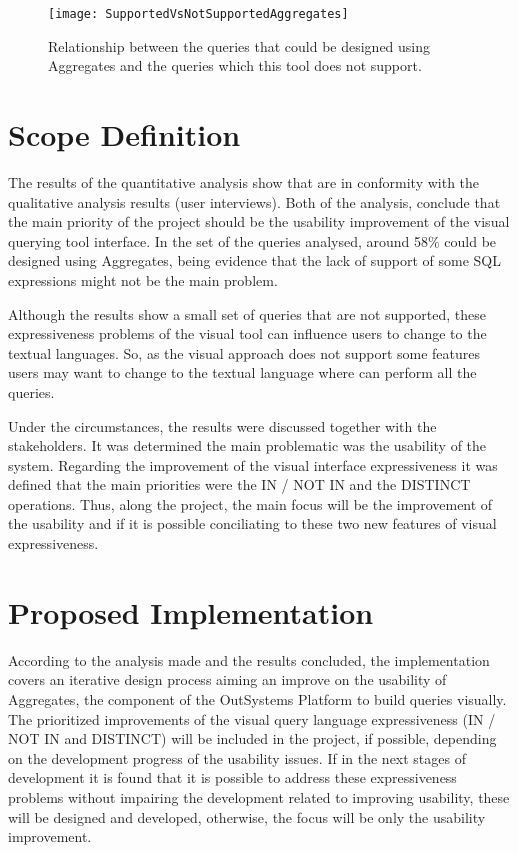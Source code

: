 \begin{figure}[htbp]
	\centering
	\texttt{[image: SupportedVsNotSupportedAggregates]}
	\caption{Relationship between the queries that could be designed using Aggregates and the queries which this tool does not support.}
	\label{fig:aggregates_supported_vs_not_supported_stats}
\end{figure}

\section{Scope Definition}
\label{sec:scope_definition}
The results of the quantitative analysis show that are in conformity with the qualitative analysis results (user interviews). Both of the analysis, conclude that the main priority of the project should be the usability improvement of the visual querying tool interface. 
In the set of the queries analysed, around 58\% could be designed using Aggregates, being evidence that the lack of support of some SQL expressions might not be the main problem.

Although the results show a small set of queries that are not supported, these expressiveness problems of the visual tool can influence users to change to the textual languages. So, as the visual approach does not support some features users may want to change to the textual language where can perform all the queries.

Under the circumstances, the results were discussed together with the stakeholders. It was determined the main problematic was the usability of the system. Regarding the improvement of the visual interface expressiveness it was defined that the main priorities were the IN / NOT IN and the DISTINCT operations. Thus, along the project, the main focus will be the improvement of the usability and if it is possible conciliating to these two new features of visual expressiveness.

\section{Proposed Implementation}
\label{sec:proposed_implementation}
According to the analysis made and the results concluded, the implementation covers an iterative design process aiming an improve on the usability of Aggregates, the component of the OutSystems Platform to build queries visually. The prioritized improvements of the visual query language expressiveness (IN / NOT IN and DISTINCT) will be included in the project, if possible, depending on the development progress of the usability issues. If in the next stages of development it is found that it is possible to address these expressiveness problems without impairing the development related to improving usability, these will be designed and developed, otherwise, the focus will be only the usability improvement.

